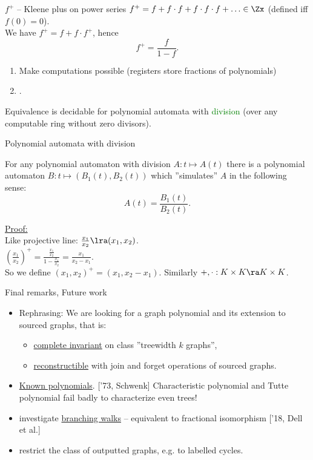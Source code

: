 \begin{frame}{$f^+$ -- Kleene plus on power series}
$f^+ = f + f\cdot f + f\cdot f \cdot f + \ldots \in \Zx$ (defined iff $f(0) = 0$).\\
We have $f^+ = f+ f\cdot f^+$, hence\\
$$
	f^+ = \frac{f}{1-f}.
$$
\pause
\begin{enumerate}[<+->]
	\item Make computations possible (registers store fractions of polynomials)
	\item {}.
\end{enumerate}
{
	\begin{tw}
		Equivalence is decidable for polynomial automata with \textcolor{green}{division} (over any computable ring without zero divisors).
	\end{tw}
}
\end{frame}
\begin{frame}{Polynomial automata with division}
\begin{lm}
	For any polynomial automaton with division $A: t \mapsto A(t)$ there is a polynomial automaton $B: t \mapsto (B_1(t), B_2(t))$ which ''simulates'' $A$ in the following sense:
	$$
		A(t) = \frac{B_1(t)}{B_2(t)}.
	$$	
\end{lm}
\pause
\underline{Proof:}
\pause
\\
	Like projective line: $\frac{x_1}{x_2} \lra (x_1, x_2)$.\\
	$\left(\frac{x_1}{x_2}\right)^+ = \frac{\frac{x_1}{x_2}}{1-\frac{x_1}{x_2}} = \frac{x_1}{x_2-x_1}$.\\
	So we define $(x_1, x_2)^+ = (x_1, x_2 - x_1)$. Similarly $+, \cdot: K\times K \ra K\times K$.	
\end{frame}
\begin{frame}{Final remarks, Future work}
\begin{itemize}[<+->]
	\item Rephrasing: We are looking for a graph polynomial and its extension to sourced graphs, that is:
	\begin{itemize}
		\item \underline{complete invariant} on class ''treewidth $k$ graphs'',
		\item \underline{reconstructible} with join and forget operations of sourced graphs.
	\end{itemize}
\pause
	\item \underline{Known polynomials}.
	 ['73, Schwenk] Characteristic polynomial and Tutte polynomial fail badly to characterize even trees!
	\item investigate \underline{branching walks} -- equivalent to fractional isomorphism ['18, Dell et al.]
	\item restrict the class of outputted graphs, e.g. to labelled cycles.
\end{itemize}
\end{frame}

